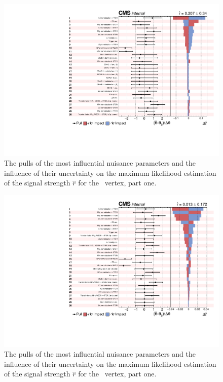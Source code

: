 \newpage
\begin{figure}[htbp] 
	\centering
	  \includegraphics[page=1,width=1.\linewidth,keepaspectratio]{6_Search/Figures/impact/171122Zut.pdf}
	\caption{The pulls of the most influential  nuisance parameters and the influence of their uncertainty on the maximum likelihood estimation of the signal strength $\hat{r}$ for the \Zut\ vertex, part one.}
	\label{fig:impactsZut1}
\end{figure}


\newpage

\begin{figure}[htbp] 
	\centering
	\includegraphics[page=1,width=1.\linewidth,keepaspectratio]{6_Search/Figures/impact/171122Zct.pdf}
	\caption{The pulls of the most influential nuisance parameters and the influence of their uncertainty on the maximum likelihood estimation of the signal strength $\hat{r}$ for the \Zct\ vertex, part one.}
	\label{fig:impactsZct1}
\end{figure}


